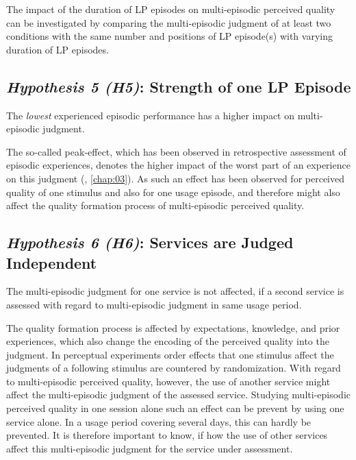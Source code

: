 The impact of the duration of \ac{LP} episodes on multi-episodic perceived quality can be investigated by comparing the multi-episodic judgment of at least two conditions with the same number and positions of \ac{LP} episode(s) with varying duration of \ac{LP} episodes.


\subsection*{\emph{Hypothesis 5 (H5)}: Strength of one \acl{LP} Episode}
\begin{hypothesis}[H5]\label{hypo:strength}
The \emph{lowest} experienced episodic performance has a higher impact on multi-episodic judgment.
\end{hypothesis}

The so-called peak-effect, which has been observed in retrospective assessment of episodic experiences, denotes the higher impact of the worst part of an experience on this judgment (\cf, \autoref{chap:03}).
As such an effect has been observed for perceived quality of one stimulus and also for one usage episode, and therefore might also affect the quality formation process of multi-episodic perceived quality.

\subsection*{\emph{Hypothesis 6 (H6)}: Services are Judged Independent}
\begin{hypothesis}[H6]\label{hypo:services}
The multi-episodic judgment for one service is not affected, if a second service is assessed with regard to multi-episodic judgment in same usage period.
\end{hypothesis}

The quality formation process is affected by expectations, knowledge, and prior experiences, which also change the encoding of the perceived quality into the judgment.
In perceptual experiments order effects that one stimulus affect the judgments of a following stimulus are countered by randomization.
With regard to multi-episodic perceived quality, however, the use of another service might affect the multi-episodic judgment of the assessed service.
Studying multi-episodic perceived quality in one session alone such an effect can be prevent by using one service alone.
In a usage period covering several days, this can hardly be prevented.
It is therefore important to know, if how the use of other services affect this multi-episodic judgment for the service under assessment.

